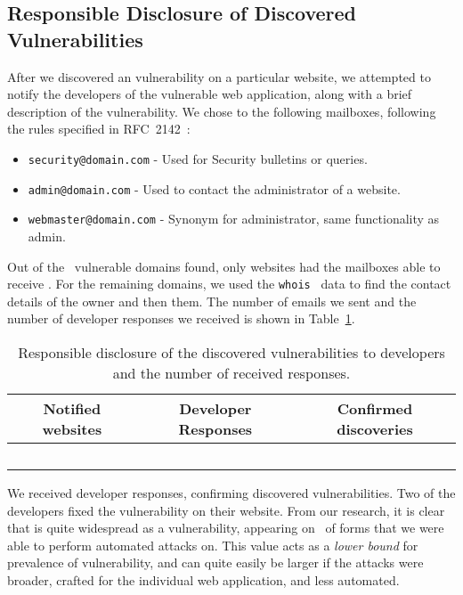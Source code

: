 \subsection{Responsible Disclosure of Discovered Vulnerabilities}
After we discovered an \ehi vulnerability on a particular website, we attempted to notify the developers of the vulnerable web application, along with a brief description of the vulnerability.
We chose to \email the following mailboxes, following the rules specified in RFC~2142~\cite{rfc2142}:
\begin{itemize}
	\item \texttt{security@domain.com} - Used for Security bulletins or queries.
	\item \texttt{admin@domain.com} - Used to contact the administrator of a website.
	\item \texttt{webmaster@domain.com} - Synonym for administrator, same functionality as admin.
\end{itemize}

Out of the \domains\ vulnerable domains found, only \emailedDefaultmailbox websites had the mailboxes able to receive \emails. For the remaining domains, we used the \texttt{whois}~\cite{whois} data to find the contact details of the owner and then \emailed them. The number of emails we sent and the number of developer responses we received is shown in Table~\ref{tab:devresp}.

\begin{table}[tbp]
\centering
\begin{tabular}{|c|c|c|}
	\hline
	\multicolumn{1}{|p{2cm}}{\centering \textbf{Notified websites}} &
	\multicolumn{1}{|p{2cm}|}{\centering \textbf{Developer Responses}} &
	\multicolumn{1}{p{2cm}|}{\centering \textbf{Confirmed discoveries}}\\
	\hline
	\domains\ & \responses & \confirmed \\
	\hline
\end{tabular}
	\caption[\titlecap{}]{Responsible disclosure of the discovered vulnerabilities to developers and the number of received responses.}
	\label{tab:devresp}
\end{table}

We received \responses developer responses, confirming \confirmed discovered vulnerabilities. Two of the developers fixed the vulnerability on their website.
From our research, it is clear that \ehi is quite widespread as a vulnerability, appearing on \successDelta\ of forms that we were able to perform automated attacks on. This value acts as a \emph{lower bound} for prevalence of \ehi vulnerability, and can quite easily be larger if the attacks were broader, crafted for the individual web application, and  less automated. 
